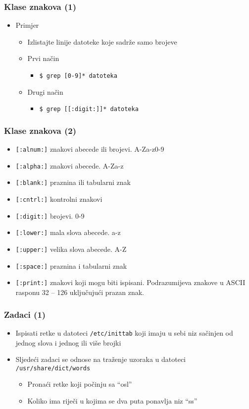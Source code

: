 \documentclass[table,usenames,dvipsnames]{beamer}
\newcommand{\shell}[1]{\texttt{#1}}
\begin{document}
\begin{frame}[t]
\frametitle{Klase znakova (1)}
\begin{itemize}
  \item Primjer
  \begin{itemize}
    \item Izlistajte linije datoteke koje sadrže samo brojeve
    \item Prvi način
    \begin{itemize}
      \item[] \shell{\$ grep [0-9]* datoteka}
    \end{itemize}
    \item Drugi način
    \begin{itemize}
      \item[] \shell{\$ grep [[:digit:]]* datoteka}
    \end{itemize}
  \end{itemize}
\end{itemize}
\end{frame}

\begin{frame}[t]
\frametitle{Klase znakova (2)}
\begin{itemize}
  \item \shell{[:alnum:]} znakovi abecede ili brojevi. A-Za-z0-9
  \item \shell{[:alpha:]} znakovi abecede. A-Za-z 
  \item \shell{[:blank:]} praznina ili tabularni znak
  \item \shell{[:cntrl:]} kontrolni znakovi
  \item \shell{[:digit:]} brojevi. 0-9
  \item \shell{[:lower:]} mala slova abecede. a-z
  \item \shell{[:upper:]} velika slova abecede. A-Z
  \item \shell{[:space:]} praznina i tabularni znak
  \item \shell{[:print:]} znakovi koji mogu biti ispisani. Podrazumijeva 
        znakove u ASCII rasponu 32 – 126 uključujući prazan znak.
\end{itemize}
\end{frame}

\begin{frame}[t]
\frametitle{Zadaci (1)}
\begin{itemize}
  \item Ispisati retke u datoteci \shell{/etc/inittab} koji imaju u sebi 
        niz sačinjen od jednog slova i jednog ili više brojki
  \item Sljedeći zadaci se odnose na traženje uzoraka u datoteci 
        \shell{/usr/share/dict/words}
  \begin{itemize}
    \item Pronaći retke koji počinju sa ``osl''
    \item Koliko ima riječi u kojima se dva puta ponavlja niz ``ss''
  \end{itemize}
\end{itemize}
\end{frame}
\end{document}
